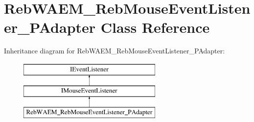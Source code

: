 \hypertarget{class_reb_w_a_e_m___reb_mouse_event_listener___p_adapter}{}\section{Reb\+W\+A\+E\+M\+\_\+\+Reb\+Mouse\+Event\+Listener\+\_\+\+P\+Adapter Class Reference}
\label{class_reb_w_a_e_m___reb_mouse_event_listener___p_adapter}
Inheritance diagram for Reb\+W\+A\+E\+M\+\_\+\+Reb\+Mouse\+Event\+Listener\+\_\+\+P\+Adapter\+:\begin{figure}[H]
\begin{center}
\leavevmode
\includegraphics[height=3.000000cm]{class_reb_w_a_e_m___reb_mouse_event_listener___p_adapter}
\end{center}
\end{figure}

